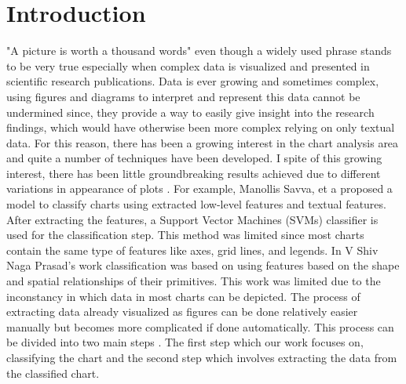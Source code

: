 \documentclass[12pt, a4paper,oneside]{report}
\begin{document}



\setcounter{tocdepth}{10}

\clearpage

\tableofcontents





\listoffigures
\listoftables

\titleformat{\chapter}{\LARGE\bfseries}{\thechapter}{1em}{}

\newpage
\chapter{Introduction}
"A picture is worth a thousand words" even though a widely used phrase stands to be very true especially when complex data is visualized and presented in scientific research publications. 
Data is ever growing and sometimes complex, using figures and diagrams to interpret and represent this data cannot be undermined since, they provide a way to easily give insight into the research findings, which would have otherwise been more complex relying on  only textual data. For this reason, there has been a growing interest in the chart analysis area and quite a number of techniques have been developed. I spite of this growing interest, there has been little groundbreaking results achieved due to different variations in appearance of plots \cite{liu2015chart}.
For example, Manollis Savva, et a \cite{savva2011revision} proposed a model to classify charts using extracted low-level features and textual features. After extracting the features, a  Support Vector Machines (SVMs) classifier is used for the classification step. This method was limited since most charts contain the same type of features like axes, grid lines, and legends.
In V Shiv Naga Prasad's work \cite{prasad2007classifying} classification was based on using features based on the shape and spatial relationships of their primitives. This work was limited due to the inconstancy in which data in most charts can be depicted.
The process of extracting data already visualized as figures can be done relatively easier manually but becomes more complicated if done automatically. This process can be divided into two main steps \cite{savva2011revision}. The first step which our work focuses on, classifying the chart and the second step which involves extracting the data from the classified chart.
\end{document}
